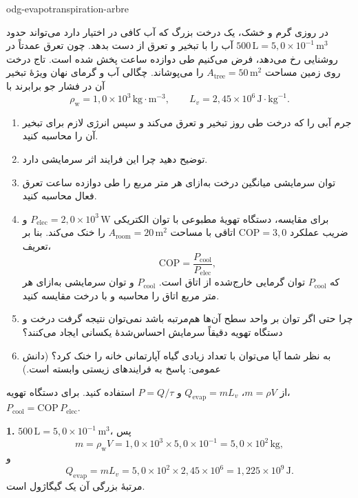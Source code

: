 \begin{exo}{odg-evapotranspiration-arbre}

در روزی گرم و خشک، یک درخت بزرگ که آب کافی در اختیار دارد می‌تواند حدود $500\,\text{L}=5{,}0\times10^{-1}\,\text{m}^3$ آب را با تبخیر و تعرق از دست بدهد. چون تعرق عمدتاً در روشنایی رخ می‌دهد، فرض می‌کنیم طی دوازده ساعت پخش شده است. تاج درخت روی زمین مساحت $A_{\mathrm{tree}}=50\,\text{m}^2$ را می‌پوشاند. چگالی آب و گرمای نهان ویژهٔ تبخیر آن در فشار جو برابرند با
\[
\rho_{\mathrm{w}}=1{,}0\times10^3\,\text{kg}\!\cdot\!\text{m}^{-3},
\qquad L_v=2{,}45\times10^6\,\text{J}\!\cdot\!\text{kg}^{-1}.
\]

\begin{enumerate}
  \item جرم آبی را که درخت طی روز تبخیر و تعرق می‌کند و سپس انرژی لازم برای تبخیر آن را محاسبه کنید.
  \item توضیح دهید چرا این فرایند اثر سرمایشی دارد.
  \item توان سرمایشی میانگین درخت به‌ازای هر متر مربع را طی دوازده ساعت تعرق فعال محاسبه کنید.
  \item برای مقایسه، دستگاه تهویهٔ مطبوعی با توان الکتریکی $P_{\mathrm{elec}}=2{,}0\times10^3\,\text{W}$ و ضریب عملکرد $\mathrm{COP}=3{,}0$ اتاقی با مساحت $A_{\mathrm{room}}=20\,\text{m}^2$ را خنک می‌کند. بنا بر تعریف،
\[
\mathrm{COP}=\frac{P_{\mathrm{cool}}}{P_{\mathrm{elec}}},
\]
که $P_{\mathrm{cool}}$ توان گرمایی خارج‌شده از اتاق است. $P_{\mathrm{cool}}$ و توان سرمایشی به‌ازای هر متر مربع اتاق را محاسبه و با درخت مقایسه کنید.
  \item چرا حتی اگر توان بر واحد سطح آن‌ها هم‌مرتبه باشد نمی‌توان نتیجه گرفت درخت و دستگاه تهویه دقیقاً سرمایش احساس‌شدهٔ یکسانی ایجاد می‌کنند؟
  \item به نظر شما آیا می‌توان با تعداد زیادی گیاه آپارتمانی خانه را خنک کرد؟ (دانش عمومی: پاسخ به فرایندهای زیستی وابسته است.)
\end{enumerate}

\begin{indication}
از $m=\rho V$، $Q_{\mathrm{evap}}=mL_v$ و $P=Q/\tau$ استفاده کنید. برای دستگاه تهویه، $P_{\mathrm{cool}}=\mathrm{COP}\,P_{\mathrm{elec}}$.
\end{indication}

\begin{solution}
\textbf{1.} $500\,\text{L}=5{,}0\times10^{-1}\,\text{m}^3$، پس
\[
m=\rho_{\mathrm{w}}V=1{,}0\times10^3\times5{,}0\times10^{-1}=5{,}0\times10^2\,\text{kg},
\]
و
\[
Q_{\mathrm{evap}}=mL_v=5{,}0\times10^2\times2{,}45\times10^6=1{,}225\times10^9\,\text{J}.
\]
مرتبهٔ بزرگی آن یک گیگاژول است.


\end{solution}
\end{exo}
